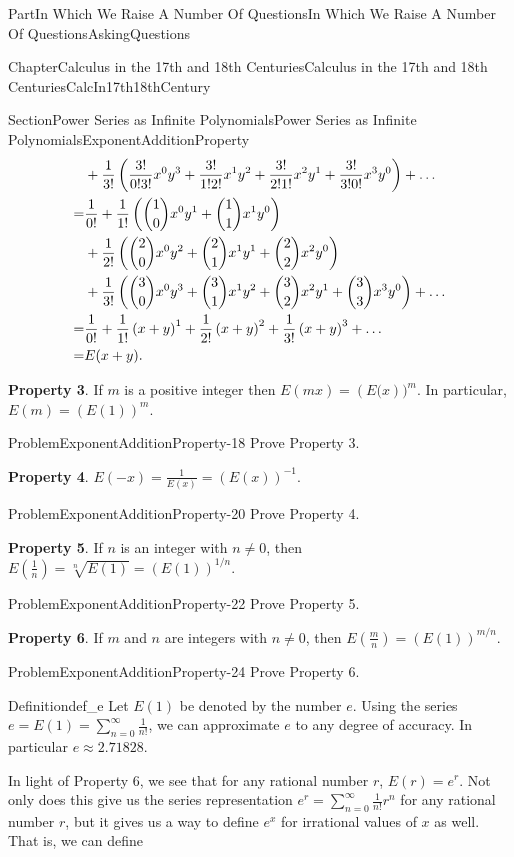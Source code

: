\documentclass[oneside,10pt,]{book}
\newcommand{\terminology}[1]{\textbf{#1}}
\numberwithin{equation}{part}
\newcommand{\amp}{&}
\begin{document}
\begin{partptx}{Part}{In Which We Raise A Number Of Questions}{}{In Which We Raise A Number Of Questions}{}{}{AskingQuestions}
\begin{chapterptx}{Chapter}{Calculus in the 17th and 18th Centuries}{}{Calculus in the 17th and 18th Centuries}{}{}{CalcIn17th18thCentury}
\begin{sectionptx}{Section}{Power Series as Infinite Polynomials}{}{Power Series as Infinite Polynomials}{}{}{ExponentAdditionProperty}
\begin{align}
\amp       +\frac{1}{3!}\left(\frac{3!}{0!3!}x^0y^3+\frac{3!}{1!2!}x^1y^2+\frac{3!}{2!1!}x^2y^1+\frac{3!}{3!0!}x^3y^0\right)+\ldots\notag\\
=\amp \frac{1}{0!}+\frac{1}{1!}\left(\binom{1}{0}x^0y^1+\binom{1}{1}x^1y^0\right)\notag\\
\amp       +\frac{1}{2!}\left(\binom{2}{0}x^0y^2+\binom{2}{1}x^1y^1+\binom{2}{2}x^2y^0\right)\notag\\
\amp       +\frac{1}{3!}\left(\binom{3}{0}x^0y^3+\binom{3}{1}x^1y^2+\binom{3}{2}x^2y^1+\binom{3}{3}x^3y^0\right)+\ldots\notag\\
=\amp \frac{1}{0!}+\frac{1}{1!}\left(x+y\right)^1+\frac{1}{2!}\left(x+y\right)^2+\frac{1}{3!}\left(x+y\right)^3+\ldots\notag\\
= \amp E(x+y)\text{.}\label{eq_ExponentAdditionProperty}
\end{align}
%
\par
\terminology{Property 3}. If \(m\) is a positive integer then \(E(mx)=\left(E(x\right))^m\). In particular, \(E(m)=\left(E(1)\right)^m\).%
\begin{problem}{Problem}{}{ExponentAdditionProperty-18}%
Prove Property 3.%
\end{problem}
\terminology{Property 4}. \(E(-x)=\frac{1}{E(x)}=\left(E(x)\right)^{-1}\).%
\begin{problem}{Problem}{}{ExponentAdditionProperty-20}%
Prove Property 4.%
\end{problem}
\terminology{Property 5}. If \(n\) is an integer with \(n\neq 0\), then \(E(\frac{1}{n})=\sqrt[n]{E(1)}=\left(E(1)\right)^{1/n}\).%
\begin{problem}{Problem}{}{ExponentAdditionProperty-22}%
Prove Property 5.%
\end{problem}
\terminology{Property 6}. If \(m\) and \(n\) are integers with \(n\neq 0\), then \(E\left(\frac{m}{n}\right)=\left(E(1)\right)^{m/n}\).%
\begin{problem}{Problem}{}{ExponentAdditionProperty-24}%
Prove Property 6.%
\end{problem}
\begin{definition}{Definition}{}{def_e}%
%
Let \(E(1)\) be denoted by the number \(e\). Using the series \(e=E(1)=\sum_{n=0}^\infty\frac{1}{n!}\), we can approximate \(e\) to any degree of accuracy. In particular \(e\approx 2.71828\).%
\end{definition}
In light of Property 6, we see that for any rational number \(r\), \(E(r)=e^r\).  Not only does this give us the series representation \(e^r=\sum_{n=0}^\infty\frac{1}{n!}r^n\) for any rational number \(r\), but it gives us a way to define \(e^x\) for irrational values of \(x\) as well.  That is, we can define%

\end{sectionptx}
\end{chapterptx}
\end{partptx}
\end{document}
